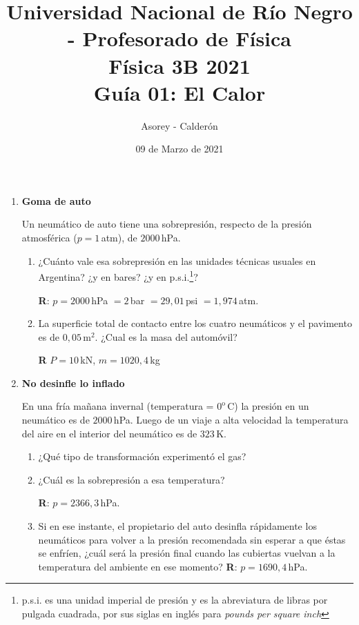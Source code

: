 \documentclass[a4paper,12pt]{article}
\begin{document}
\title{
{\normalsize{Universidad Nacional de Río Negro - Profesorado de Física}}\\
Física 3B  2021 \\ Guía 01: El Calor}
\author{Asorey - Calderón}
\date{09 de Marzo de 2021}
\maketitle

\begin{enumerate}
	\setcounter{enumi}{0}

	\item {\bf{Goma de auto}}
		
		Un neumático de auto tiene una sobrepresión, respecto de la presión
		atmosférica ($p=1$\,atm), de $2000$\,hPa.
		\begin{enumerate}
			\item ¿Cuánto vale esa sobrepresión en las unidades técnicas usuales en
				Argentina? ¿y en bares? ¿y en p.s.i.\footnote{p.s.i. es una
				unidad imperial de presión y es la abreviatura de libras por
				pulgada cuadrada, por sus siglas en inglés para {\textit{pounds
				per square inch}}}? 
				
				{\bf R}: $p=2000$\,hPa $= 2$\,bar $= 29,01$\,psi $= 1,974$\,atm.
			\item La superficie total de contacto entre los cuatro neumáticos y
				el pavimento es de $0,05$\,m$^2$. ¿Cual es la masa del
				automóvil?
				
				{\bf R} $P = 10$\,kN, $m=1020,4$\,kg
		\end{enumerate}
	
	\item {\bf{No desinfle lo inflado}}
		
		En una fría mañana invernal (temperatura = $0^\mathrm{o}$\,C) la
		presión en un neumático es de $2000$\,hPa. Luego de un viaje a alta
		velocidad la temperatura del aire en el interior del neumático es de
		$323$\,K.
		\begin{enumerate}
			\item ¿Qué tipo de transformación experimentó el gas?
			\item ¿Cuál es la sobrepresión a esa temperatura?

				{\bf R}: $p=2366,3$\,hPa.
			\item Si en ese instante, el propietario del auto desinfla
				rápidamente los neumáticos para volver a la presión recomendada
				sin esperar a que éstas se enfríen, ¿cuál será la presión final
				cuando las cubiertas vuelvan a la temperatura del ambiente en
				ese momento?
				{\bf R}: $p=1690,4$\,hPa.
		\end{enumerate}
	

\end{enumerate}
\end{document}

